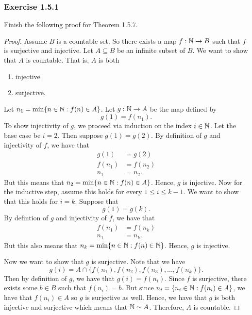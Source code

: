 \subsubsection{Exercise 1.5.1}
Finish the following proof for Theorem 1.5.7.
\begin{proof}
Assume \( B \) is a countable set. So there exists a map \( f: \mathbb{N} \to B \) such that \( f \) is surjective and injective. Let \( A \subseteq B \) be an infinite subset of \( B \). We want to show that \( A \) is countable. That is, \( A \) is both 
\begin{enumerate}
    \item injective 
    \item surjective. 
\end{enumerate}
Let \( n_1 = \min \{ n \in \mathbb{N}: f(n) \in A  \}\). Let \( g: \mathbb{N} \to A  \) be the map defined by 
\[ g(1) = f(n_1).\]
To show injectivity of \( g\), we proceed via induction on the index \( i \in \mathbb{N} \). Let the base case be \( i = 2 \). Then suppose \( g(1) = g(2) \). By definition of \( g \) and injectivity of \( f \), we have that 
\begin{align*}
g(1)&= g(2) \\ 
f(n_1) &= f(n_2) \\
n_1 &= n_2.
\end{align*}
But this means that \( n_2 =\min  \{  n \in \mathbb{N} : f(n) \in A  \}\). Hence, \( g \) is injective. Now for the inductive step, assume this holds for every \( 1 \leq i \leq k - 1 \). We want to show that this holds for \( i = k \). Suppose that 
\[ g(1) = g(k).\]
By defintion of \( g \) and injectivity of \( f \), we have that 
\begin{align*}
f(n_1)&=f(n_k) \\
n_1 &= n_k.
\end{align*}
But this also means that \( n_k = \min \{ n \in \mathbb{N} : f(n) \in \mathbb{N} \} \). Hence, \( g \) is injective. 

Now we want to show that \( g \) is surjective. Note that we have 
\[ g(i) = A \cap \{ f(n_1), f(n_2), f(n_3), ..., f(n_k) \}.\]
Then by definition of \( g \), we have that \( g(i) = f(n_i) \). Since \( f \) is surjective, there exists some \( b \in B \) such that \( f(n_i) = b \). But since \( n_i = \{ n_i \in \mathbb{N} : f(n_i) \in A  \}\), we have that \( f(n_i) \in A \) so \( g \) is surjective as well. Hence, we have that \( g \) is both injective and surjective which means that \( \mathbb{N} \sim A \). Therefore, \( A \) is countable.  

\end{proof} 




